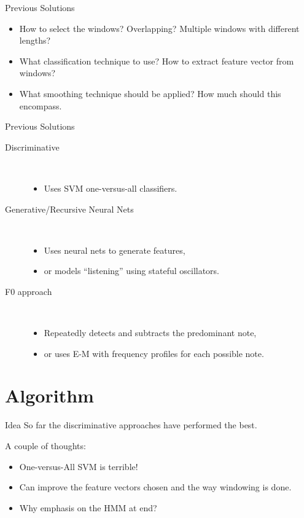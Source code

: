 \documentclass{beamer}
\begin{document}
\begin{frame}{Previous Solutions}
\begin{itemize}
\item How to select the windows? Overlapping? Multiple windows with different lengths?
\item What classification technique to use? How to extract feature vector from windows?
\item What smoothing technique should be applied? How much should this encompass.
\end{itemize}
\end{frame}

\begin{frame}{Previous Solutions}
\begin{description} 
\item[Discriminative] \hfill \\ 
    \begin{itemize}\setlength{\itemindent}{-5em}
    \item  Uses SVM one-versus-all classifiers.
    \end{itemize}
\item[Generative/Recursive Neural Nets] \hfill \\
    \begin{itemize}\setlength{\itemindent}{-5em}
    \item Uses neural nets to generate features,
    \item or models ``listening'' using stateful oscillators.
    \end{itemize}
\item[F0 approach] \hfill \\
    \begin{itemize}\setlength{\itemindent}{-5em}
    \item Repeatedly detects and subtracts the predominant note,
    \item or uses E-M with frequency profiles for each possible note.
    \end{itemize}
\end{description}
\end{frame}

\section{Algorithm}
\begin{frame}{Idea}
So far the discriminative approaches have performed the best.\\
\vspace{.5cm}

\pause
A couple of thoughts:
\begin{itemize}
\item One-versus-All SVM is terrible!
\item Can improve the feature vectors chosen and the way windowing is done.
\item Why emphasis on the HMM at end? %
\end{itemize}
\end{frame}
\end{document}
